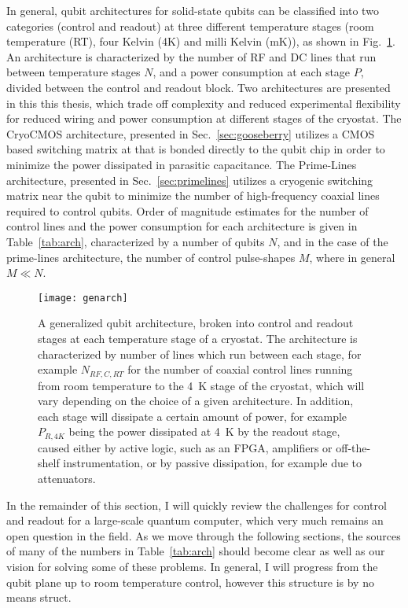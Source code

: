 In general, qubit architectures for solid-state qubits can be classified into two categories (control and readout) at three different temperature stages
(room temperature (RT), four Kelvin (4K) and milli Kelvin (mK)), as shown in Fig.~\ref{fig:genarch}. An
architecture is characterized by the number of RF and DC lines that run between temperature stages $N$, and a power consumption at each stage $P$, divided between the control
and readout block. Two architectures are presented in this this thesis, which trade off complexity and reduced experimental flexibility for reduced wiring and power consumption
at different stages of the cryostat. The CryoCMOS architecture, presented in Sec.~\ref{sec:gooseberry} utilizes a CMOS based switching matrix at that is
bonded directly to the qubit chip in order to minimize the power dissipated in parasitic capacitance. The Prime-Lines architecture, presented in Sec.~\ref{sec:primelines}
utilizes a cryogenic switching matrix near the qubit to minimize the number of high-frequency coaxial lines required to control qubits. Order of magnitude estimates
for the number of control lines and the power consumption for each architecture is given in Table~\ref{tab:arch}, characterized by a number of qubits $N$,
and in the case of the prime-lines architecture, the number of control pulse-shapes $M$, where in general $M \ll N$.

\begin{figure}
  \texttt{[image: genarch]}
  \caption[Generalized quantum computing architecture]
  {\label{fig:genarch}A generalized qubit architecture, broken into control and readout stages at each temperature stage of a cryostat. The architecture is characterized by number of lines which run between each stage, for example $N_{RF,C,RT}$ for the number of coaxial control lines running from room temperature to the \SI{4}{\kelvin} stage of the cryostat, which will vary depending on the choice of a given architecture. In addition, each stage will dissipate a certain amount of power, for example $P_{R,4K}$ being the power dissipated at \SI{4}{\kelvin} by the readout stage, caused either by active logic, such as an FPGA, amplifiers or off-the-shelf instrumentation, or by passive dissipation, for example due to attenuators.}
\end{figure}

In the remainder of this section, I will quickly review the challenges for control and readout for a large-scale quantum computer, which very much remains
an open question in the field. As we move through the following sections, the sources of many of the numbers in Table~\ref{tab:arch} should become clear
as well as our vision for solving some of these problems. In general, I will progress from the qubit plane up to room temperature control, however this
structure is by no means struct.

